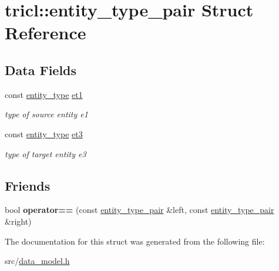 \hypertarget{structtricl_1_1entity__type__pair}{}\section{tricl\+:\+:entity\+\_\+type\+\_\+pair Struct Reference}
\label{structtricl_1_1entity__type__pair}
\subsection*{Data Fields}
\begin{DoxyCompactItemize}
\item 
\mbox{\label{structtricl_1_1entity__type__pair_a8ac4e6ba084913026bf261240ff4c062}} 
const \hyperlink{data__model_8h_afd4de3aedd5e48cf955f03457386e98f}{entity\+\_\+type} \hyperlink{structtricl_1_1entity__type__pair_a8ac4e6ba084913026bf261240ff4c062}{et1}
\begin{DoxyCompactList}\small\item\em type of source entity e1 \end{DoxyCompactList}\item 
\mbox{\label{structtricl_1_1entity__type__pair_a677ea5a09e9a0d0dc03680d5be3afacd}} 
const \hyperlink{data__model_8h_afd4de3aedd5e48cf955f03457386e98f}{entity\+\_\+type} \hyperlink{structtricl_1_1entity__type__pair_a677ea5a09e9a0d0dc03680d5be3afacd}{et3}
\begin{DoxyCompactList}\small\item\em type of target entity e3 \end{DoxyCompactList}\end{DoxyCompactItemize}
\subsection*{Friends}
\begin{DoxyCompactItemize}
\item 
\mbox{\label{structtricl_1_1entity__type__pair_ab148ef41047fcbd537a8f98b11e11045}} 
bool {\bfseries operator==} (const \hyperlink{structtricl_1_1entity__type__pair}{entity\+\_\+type\+\_\+pair} \&left, const \hyperlink{structtricl_1_1entity__type__pair}{entity\+\_\+type\+\_\+pair} \&right)
\end{DoxyCompactItemize}


The documentation for this struct was generated from the following file\+:\begin{DoxyCompactItemize}
\item 
src/\hyperlink{data__model_8h}{data\+\_\+model.\+h}\end{DoxyCompactItemize}
